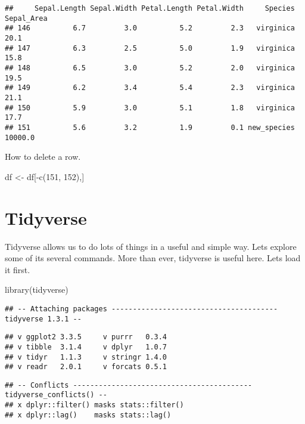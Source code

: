 \documentclass[
]{book}
\newenvironment{Shaded}{\begin{snugshade}}{\end{snugshade}}
\newcommand{\DecValTok}[1]{\textcolor[rgb]{0.00,0.00,0.81}{#1}}
\newcommand{\FunctionTok}[1]{\textcolor[rgb]{0.00,0.00,0.00}{#1}}
\newcommand{\NormalTok}[1]{#1}
\newcommand{\OtherTok}[1]{\textcolor[rgb]{0.56,0.35,0.01}{#1}}
\newcommand{\SpecialCharTok}[1]{\textcolor[rgb]{0.00,0.00,0.00}{#1}}
\begin{document}
\begin{verbatim}
##     Sepal.Length Sepal.Width Petal.Length Petal.Width     Species Sepal_Area
## 146          6.7         3.0          5.2         2.3   virginica       20.1
## 147          6.3         2.5          5.0         1.9   virginica       15.8
## 148          6.5         3.0          5.2         2.0   virginica       19.5
## 149          6.2         3.4          5.4         2.3   virginica       21.1
## 150          5.9         3.0          5.1         1.8   virginica       17.7
## 151          5.6         3.2          1.9         0.1 new_species    10000.0
\end{verbatim}

How to delete a row.

\begin{Shaded}
\begin{Highlighting}[]
\NormalTok{df }\OtherTok{\textless{}{-}}\NormalTok{ df[}\SpecialCharTok{{-}}\FunctionTok{c}\NormalTok{(}\DecValTok{151}\NormalTok{, }\DecValTok{152}\NormalTok{),]}
\end{Highlighting}
\end{Shaded}

\hypertarget{tidyverse}{%
\section{Tidyverse}\label{tidyverse}}

Tidyverse allows us to do lots of things in a useful and simple way. Lets explore some of its several commands.
More than ever, tidyverse is useful here. Lets load it first.

\begin{Shaded}
\begin{Highlighting}[]
\FunctionTok{library}\NormalTok{(tidyverse)}
\end{Highlighting}
\end{Shaded}

\begin{verbatim}
## -- Attaching packages --------------------------------------- tidyverse 1.3.1 --
\end{verbatim}

\begin{verbatim}
## v ggplot2 3.3.5     v purrr   0.3.4
## v tibble  3.1.4     v dplyr   1.0.7
## v tidyr   1.1.3     v stringr 1.4.0
## v readr   2.0.1     v forcats 0.5.1
\end{verbatim}

\begin{verbatim}
## -- Conflicts ------------------------------------------ tidyverse_conflicts() --
## x dplyr::filter() masks stats::filter()
## x dplyr::lag()    masks stats::lag()
\end{verbatim}
\end{document}
